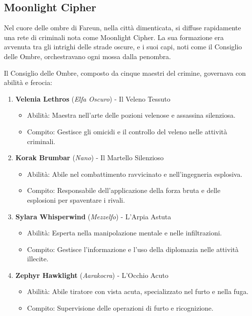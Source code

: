 \documentclass{article}
\begin{document}
\subsection{Moonlight Cipher}
Nel cuore delle ombre di Fareun, nella città dimenticata, si diffuse rapidamente una rete di criminali nota come Moonlight Cipher. La sua formazione era avvenuta tra gli intrighi delle strade oscure, e i suoi capi, noti come il Consiglio delle Ombre, orchestravano ogni mossa dalla penombra.

Il Consiglio delle Ombre, composto da cinque maestri del crimine, governava con abilità e ferocia:
\begin{enumerate}
  \item \textbf{Velenia Lethros} (\textit{Elfa Oscuro}) - Il Veleno Tessuto
    \begin{itemize}
      \item Abilità: Maestra nell'arte delle pozioni velenose e assassina silenziosa.
      \item Compito: Gestisce gli omicidi e il controllo del veleno nelle attività criminali.
    \end{itemize}
  
  \item \textbf{Korak Brumbar} (\textit{Nano}) - Il Martello Silenzioso
    \begin{itemize}
      \item Abilità: Abile nel combattimento ravvicinato e nell'ingegneria esplosiva.
      \item Compito: Responsabile dell'applicazione della forza bruta e delle esplosioni per spaventare i rivali.
    \end{itemize}
  
  \item \textbf{Sylara Whisperwind} (\textit{Mezzelfo}) - L'Arpia Astuta
    \begin{itemize}
      \item Abilità: Esperta nella manipolazione mentale e nelle infiltrazioni.
      \item Compito: Gestisce l'informazione e l'uso della diplomazia nelle attività illecite.
    \end{itemize}
  
  \item \textbf{Zephyr Hawklight} (\textit{Aarakocra}) - L'Occhio Acuto
    \begin{itemize}
      \item Abilità: Abile tiratore con vista acuta, specializzato nel furto e nella fuga.
      \item Compito: Supervisione delle operazioni di furto e ricognizione.
    \end{itemize}
  

\end{enumerate}
\end{document}
